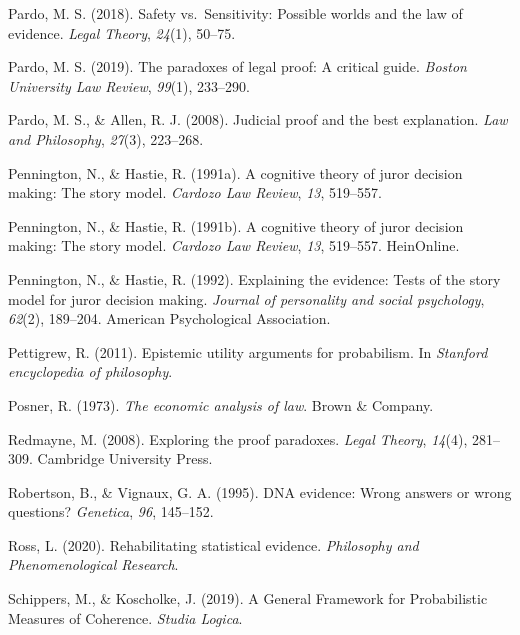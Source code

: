 \documentclass[11pt,dvipsnames,enabledeprecatedfontcommands]{scrartcl}
\begin{document}
\leavevmode\hypertarget{ref-pardo2018}{}%
Pardo, M. S. (2018). Safety vs.~Sensitivity: Possible worlds and the law
of evidence. \emph{Legal Theory}, \emph{24}(1), 50--75.

\leavevmode\hypertarget{ref-pardo2019}{}%
Pardo, M. S. (2019). The paradoxes of legal proof: A critical guide.
\emph{Boston University Law Review}, \emph{99}(1), 233--290.

\leavevmode\hypertarget{ref-Pardo2008judicial}{}%
Pardo, M. S., \& Allen, R. J. (2008). Judicial proof and the best
explanation. \emph{Law and Philosophy}, \emph{27}(3), 223--268.

\leavevmode\hypertarget{ref-Pennington1991}{}%
Pennington, N., \& Hastie, R. (1991a). A cognitive theory of juror
decision making: The story model. \emph{Cardozo Law Review}, \emph{13},
519--557.

\leavevmode\hypertarget{ref-pennington1991cognitive}{}%
Pennington, N., \& Hastie, R. (1991b). A cognitive theory of juror
decision making: The story model. \emph{Cardozo Law Review}, \emph{13},
519--557. HeinOnline.

\leavevmode\hypertarget{ref-pennington1992explaining}{}%
Pennington, N., \& Hastie, R. (1992). Explaining the evidence: Tests of
the story model for juror decision making. \emph{Journal of personality
and social psychology}, \emph{62}(2), 189--204. American Psychological
Association.

\leavevmode\hypertarget{ref-Pettigrew2011Epistemic-Utili}{}%
Pettigrew, R. (2011). Epistemic utility arguments for probabilism. In
\emph{Stanford encyclopedia of philosophy}.

\leavevmode\hypertarget{ref-Posner1973}{}%
Posner, R. (1973). \emph{The economic analysis of law}. Brown \&
Company.

\leavevmode\hypertarget{ref-redmayne2008exploring}{}%
Redmayne, M. (2008). Exploring the proof paradoxes. \emph{Legal Theory},
\emph{14}(4), 281--309. Cambridge University Press.

\leavevmode\hypertarget{ref-Robertson1995evidence}{}%
Robertson, B., \& Vignaux, G. A. (1995). DNA evidence: Wrong answers or
wrong questions? \emph{Genetica}, \emph{96}, 145--152.

\leavevmode\hypertarget{ref-ross2020}{}%
Ross, L. (2020). Rehabilitating statistical evidence. \emph{Philosophy
and Phenomenological Research}.

\leavevmode\hypertarget{ref-Schippers2019General}{}%
Schippers, M., \& Koscholke, J. (2019). A General Framework for
Probabilistic Measures of Coherence. \emph{Studia Logica}.
\end{document}
